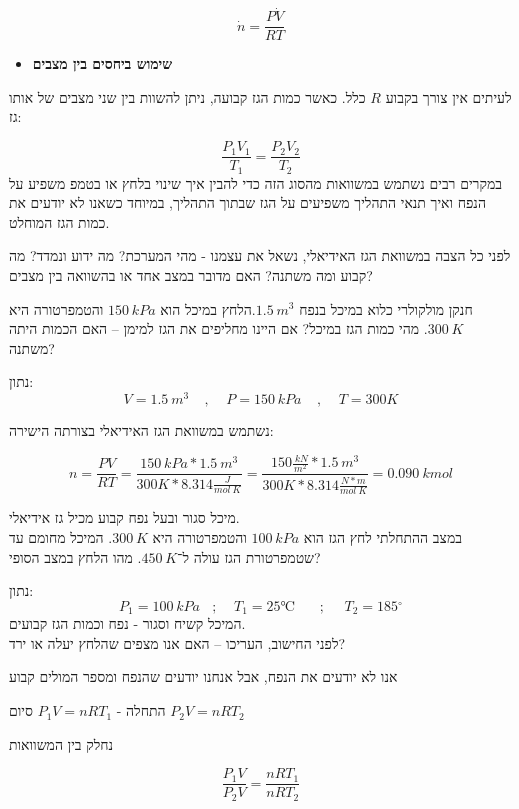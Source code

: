 \documentclass[
  hebrew,
  letterpaper,
  DIV=11,
  numbers=noendperiod]{scrreprt}
\providecommand{\tightlist}{%
  \setlength{\itemsep}{0pt}\setlength{\parskip}{0pt}}
\begin{document}
\[\dot{n} = \frac{P\dot{V}}{RT}\]

\begin{itemize}
\tightlist
\item
  \textbf{שימוש ביחסים בין מצבים}
\end{itemize}

לעיתים אין צורך בקבוע \(R\) כלל. כאשר כמות הגז קבועה, ניתן להשוות בין
שני מצבים של אותו גז:

\[\frac{P_{1}V_{1}}{T_{1}} = \frac{P_{2}V_{2}}{T_{2}}\] במקרים רבים
נשתמש במשוואות מהסוג הזה כדי להבין איך שינוי בלחץ או
בטמפ\textquotesingle{} משפיע על הנפח ואיך תנאי התהליך משפיעים על הגז
שבתוך התהליך, במיוחד כשאנו לא יודעים את כמות הגז המוחלט.

לפני כל הצבה במשוואת הגז האידיאלי, נשאל את עצמנו - מהי המערכת? מה ידוע
ונמדד? מה קבוע ומה משתנה? האם מדובר במצב אחד או בהשוואה בין מצבים?

חנקן מולקולרי כלוא במיכל בנפח \(1.5\text{ }m^{3}\).הלחץ במיכל הוא
\(150\text{ }kPa\) והטמפרטורה היא \(300\text{ }K\). מהי כמות הגז במיכל?
אם היינו מחליפים את הגז למימן -- האם הכמות היתה משתנה?

נתון:\\
\[V = 1.5\text{ }m^{3}\ \ \ \ \ ,\ \ \ \ \ P = 150\text{ }kPa\ \ \ \ \ ,\ \ \ \ \ T = 300K\]

נשתמש במשוואת הגז האידיאלי בצורתה הישירה:

\[n = \frac{PV}{RT} = \frac{150\text{ }kPa*1.5\text{ }m^{3}}{300K*8.314\frac{J}{mol\ K}} = \frac{150\frac{\text{ }kN}{m^{2}}*1.5\text{ }m^{3}}{300K*8.314\frac{N*m}{mol\ K}} = 0.090\ kmol\]

מיכל סגור ובעל נפח קבוע מכיל גז אידיאלי.\\
במצב ההתחלתי לחץ הגז הוא \(100\text{ }kPa\) והטמפרטורה היא
\(300\text{ }K\). המיכל מחומם עד שטמפרטורת הגז עולה ל־\(450\text{ }K\).
מהו הלחץ במצב הסופי?

נתון:\\
\[P_{1} = 100\text{ }kPa\ \ \ \ ;\ \ \ \ \ T_{1} = 25℃\ \ \ \ \ \ \ \ ;\ \ \ \ \ \ T_{2} = 185{^\circ}\]
המיכל קשיח וסגור - נפח וכמות הגז קבועים.\\
לפני החישוב, העריכו -- האם אנו מצפים שהלחץ יעלה או ירד?

אנו לא יודעים את הנפח, אבל אנחנו יודעים שהנפח ומספר המולים קבוע

התחלה - \(P_{1}V = nRT_{1}\) סיום \(P_{2}V = nRT_{2}\)

נחלק בין המשוואות

\[\frac{P_{1}V}{P_{2}V} = \frac{nRT_{1}}{nRT_{2}}\]
\end{document}
